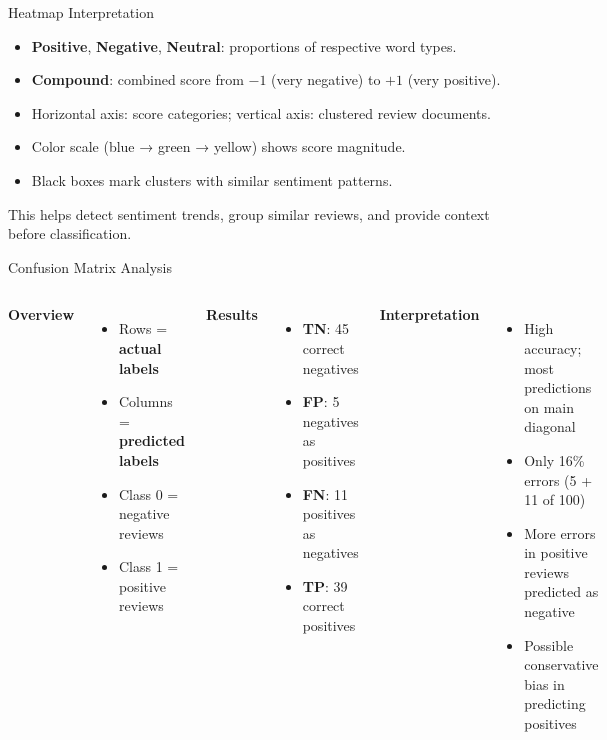\documentclass[aspectratio=169, table]{beamer}
\begin{document}
\begin{frame}{Heatmap Interpretation}
	\vspace{20pt}
	\begin{itemize}
		\item \textbf{Positive}, \textbf{Negative}, \textbf{Neutral}: proportions of respective word types.
		\item \textbf{Compound}: combined score from $-1$ (very negative) to $+1$ (very positive).
		\item Horizontal axis: score categories; vertical axis: clustered review documents.
		\item Color scale (blue → green → yellow) shows score magnitude.
		\item Black boxes mark clusters with similar sentiment patterns.
	\end{itemize}
	This helps detect sentiment trends, group similar reviews, 
	and provide context before classification.
\end{frame}

\begin{frame}{Confusion Matrix Analysis}
	\vspace{20pt}
	\begin{columns}[T,totalwidth=\textwidth]
		\textbf{Overview}
		\begin{itemize}
			\item Rows = \textbf{actual labels}
			\item Columns = \textbf{predicted labels}
			\item Class 0 = negative reviews
			\item Class 1 = positive reviews
		\end{itemize}
		
		\vspace{0.5em}
		\textbf{Results}
		\begin{itemize}
			\item \textbf{TN}: 45 correct negatives
			\item \textbf{FP}: 5 negatives as positives
			\item \textbf{FN}: 11 positives as negatives
			\item \textbf{TP}: 39 correct positives
		\end{itemize}
		
		\textbf{Interpretation}
		\begin{itemize}
			\item High accuracy; most predictions on main diagonal
			\item Only 16\% errors (5 + 11 of 100)
			\item More errors in positive reviews predicted as negative
			\item Possible conservative bias in predicting positives
		\end{itemize}
	\end{columns}
\end{frame}
\end{document}
